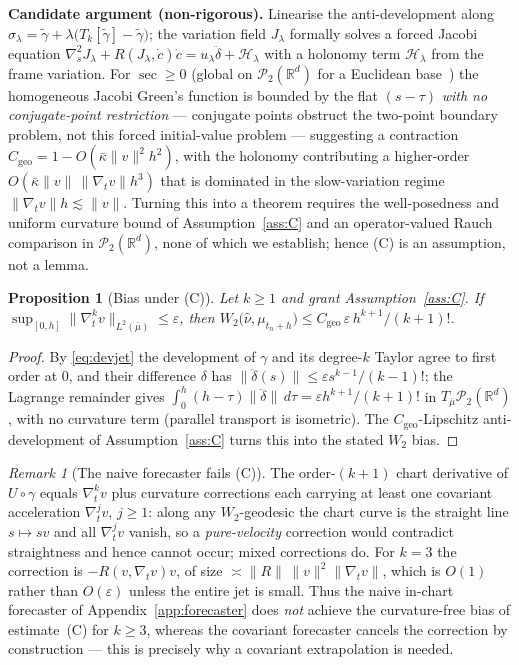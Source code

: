 \documentclass[11pt]{article}
\newtheorem{proposition}{Proposition}
\theoremstyle{definition}
\theoremstyle{remark}
\newtheorem{remark}{Remark}
\newcommand{\R}{\mathbb{R}}
\newcommand{\PP}{\mathcal{P}_2(\R^d)}
\begin{document}
\noindent\textbf{Candidate argument (non-rigorous).} Linearise the anti-development along
$\sigma_\lambda=\widetilde\gamma+\lambda\big(T_k[\widetilde\gamma]-\widetilde\gamma\big)$; the
variation field $J_\lambda$ formally solves a forced Jacobi equation
$\nabla_s^{2}J_\lambda+R(J_\lambda,\dot c)\dot c=u_\lambda\ddot\delta+\mathcal H_\lambda$ with a
holonomy term $\mathcal H_\lambda$ from the frame variation. For $\sec\ge0$ (global on $\PP$ for a
Euclidean base~\cite{ags,villani}) the homogeneous Jacobi Green's function is bounded by the flat
$(s-\tau)$ \emph{with no conjugate-point restriction} --- conjugate points obstruct the two-point
boundary problem, not this forced initial-value problem --- suggesting a contraction
$C_{\mathrm{geo}}=1-O(\bar\kappa\|v\|^2h^2)$, with the holonomy contributing a higher-order
$O(\bar\kappa\|v\|\,\|\nabla_t v\|h^3)$ that is dominated in the slow-variation regime
$\|\nabla_t v\|h\lesssim\|v\|$. Turning this into a theorem requires the well-posedness and uniform
curvature bound of Assumption~\ref{ass:C} and an operator-valued Rauch comparison in $\PP$, none of
which we establish; hence (C) is an assumption, not a lemma.

\begin{proposition}[Bias under (C)]\label{prop:covbias}
Let $k\ge1$ and grant Assumption~\ref{ass:C}. If
$\sup_{[0,h]}\|\nabla_t^{k}v\|_{L^2(\bar\mu)}\le\varepsilon$, then
$W_2\big(\widehat\nu,\mu_{t_n+h}\big)\le C_{\mathrm{geo}}\,\varepsilon\,h^{k+1}/(k+1)!$.
\end{proposition}
\begin{proof}
By \eqref{eq:devjet} the development of $\gamma$ and its degree-$k$ Taylor agree to first order at
$0$, and their difference $\delta$ has $\|\ddot\delta(s)\|\le\varepsilon s^{k-1}/(k-1)!$; the Lagrange
remainder gives $\int_0^h(h-\tau)\|\ddot\delta\|\,d\tau=\varepsilon h^{k+1}/(k+1)!$ in
$T_{\bar\mu}\PP$, with no curvature term (parallel transport is isometric). The
$C_{\mathrm{geo}}$-Lipschitz anti-development of Assumption~\ref{ass:C} turns this into the stated
$W_2$ bias.
\end{proof}
\begin{remark}[The naive forecaster fails (C)]\label{rem:naivefails}
The order-$(k{+}1)$ chart derivative of $U\circ\gamma$ equals $\nabla_t^{k}v$ plus curvature
corrections each carrying at least one covariant acceleration $\nabla_t^{j}v$, $j\ge1$: along any
$W_2$-geodesic the chart curve is the straight line $s\mapsto sv$ and all $\nabla_t^{j}v$ vanish, so
a \emph{pure-velocity} correction would contradict straightness and hence cannot occur; mixed
corrections do. For $k=3$ the correction is $-R(v,\nabla_t v)v$, of size
$\asymp\|R\|\,\|v\|^{2}\|\nabla_t v\|$, which is $O(1)$ rather than $O(\varepsilon)$ unless the
entire jet is small. Thus the naive in-chart forecaster of Appendix~\ref{app:forecaster} does
\emph{not} achieve the curvature-free bias of estimate~(C) for $k\ge3$, whereas the covariant
forecaster cancels the correction by construction --- this is precisely why a covariant extrapolation
is needed.
\end{remark}
\end{document}
